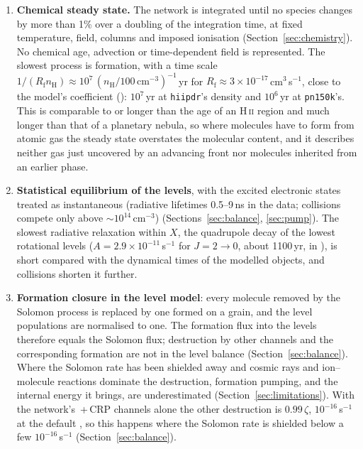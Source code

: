 \begin{enumerate}
\item \textbf{Chemical steady state.} The network is integrated until no
  species changes by more than 1\% over a doubling of the integration time, at
  fixed temperature, field, columns and imposed ionisation
  (Section~\ref{sec:chemistry}). No chemical age, advection or time-dependent
  field is represented. The slowest process is \Htwo{} formation, with a time
  scale $1/(R_{\mathrm f}n_{\mathrm H})\approx10^7\,(n_{\mathrm H}/100\,\mathrm{cm^{-3}})^{-1}$\,yr
  for $R_{\mathrm f}\approx3\times10^{-17}$\,cm$^3$\,s$^{-1}$, close to the model's
  coefficient (): $10^7$\,yr at \texttt{hiipdr}'s density and $10^6$\,yr
  at \texttt{pn150k}'s. This is comparable to or longer than the age of an
  H\,\textsc{ii} region and much longer than that of a planetary nebula, so where molecules
  have to form from atomic gas the steady state overstates the molecular
  content, and it describes neither gas just uncovered by an advancing front
  nor molecules inherited from an earlier phase.
\item \textbf{Statistical equilibrium of the \Htwo{} levels}, with the
  excited electronic states treated as instantaneous (radiative lifetimes
  0.5--9\,ns in the data; collisions compete only above
  $\sim10^{14}$\,cm$^{-3}$) (Sections~\ref{sec:balance}, \ref{sec:pump}). The slowest radiative
  relaxation within $X$, the quadrupole decay of the lowest rotational levels
  ($A=2.9\times10^{-11}$\,s$^{-1}$ for $J=2\to0$, about 1100\,yr, in
  ), is short compared with the dynamical
  times of the modelled objects, and collisions shorten it further.
\item \textbf{Formation closure in the level model}: every molecule removed by
  the Solomon process is replaced by one formed on a grain, and the level
  populations are normalised to one. The formation flux into the levels
  therefore equals the Solomon flux; destruction by other channels and the
  corresponding formation are not in the level balance
  (Section~\ref{sec:balance}). Where the Solomon rate has been shielded away
  and cosmic rays and ion--molecule reactions dominate the destruction,
  formation pumping, and the internal energy it brings, are underestimated
  (Section~\ref{sec:limitations}). With the network's \Htwo\,+\,CRP channels
  alone the other destruction is $0.99\,\zeta$, $10^{-16}$\,s$^{-1}$ at the
  default , so this happens where the Solomon rate is shielded
  below a few $10^{-16}$\,s$^{-1}$ (Section~\ref{sec:balance}).

\end{enumerate}
